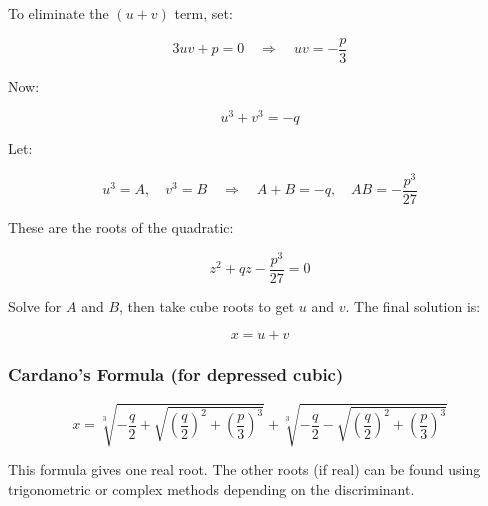 To eliminate the \((u+v)\) term, set:

\[
3uv + p = 0 \quad \Rightarrow \quad uv = -\frac{p}{3}
\]

Now:

\[
u^3 + v^3 = -q
\]

Let:

\[
u^3 = A, \quad v^3 = B \quad \Rightarrow \quad A + B = -q, \quad AB = -\frac{p^3}{27}
\]

These are the roots of the quadratic:

\[
z^2 + qz - \frac{p^3}{27} = 0
\]

Solve for \(A\) and \(B\), then take cube roots to get \(u\) and \(v\). The final solution is:

\[
x = u + v
\]

\subsubsection{Cardano’s Formula (for depressed cubic)}

\[
x = \sqrt[3]{-\frac{q}{2} + \sqrt{{\left(\frac{q}{2}\right)}^2 + {\left(\frac{p}{3}\right)}^3}} + \sqrt[3]{-\frac{q}{2} - \sqrt{{\left(\frac{q}{2}\right)}^2 + {\left(\frac{p}{3}\right)}^3}}
\]

This formula gives one real root. The other roots (if real) can be found using trigonometric or complex methods depending on the discriminant.


